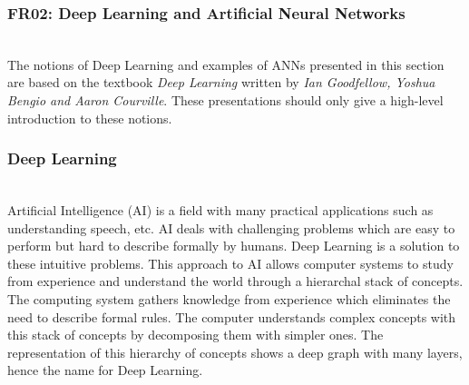 
\subsubsection{FR02: Deep Learning and Artificial Neural Networks}~\\

The notions of Deep Learning and examples of ANNs presented in this section are
based on the textbook \textit{Deep Learning}\cite{Goodfellow-et-al-2016} written
by \textit{Ian Goodfellow, Yoshua Bengio and Aaron Courville}. These
presentations should only give a high-level introduction to these notions.

\subsubsection{Deep Learning}~\\

Artificial Intelligence (AI) is a field with many practical applications such as
understanding speech, etc. AI deals with challenging problems which are easy to
perform but hard to describe formally by humans. Deep Learning is a solution to
these intuitive problems. This approach to AI allows computer systems to study
from experience and understand the world through a hierarchal stack of concepts.
The computing system gathers knowledge from experience which eliminates the need
to describe formal rules. The computer understands complex concepts with this
stack of concepts by decomposing them with simpler ones. The representation of
this hierarchy of concepts shows a deep graph with many layers, hence the name
for Deep Learning.~\cite{Goodfellow-et-al-2016}
